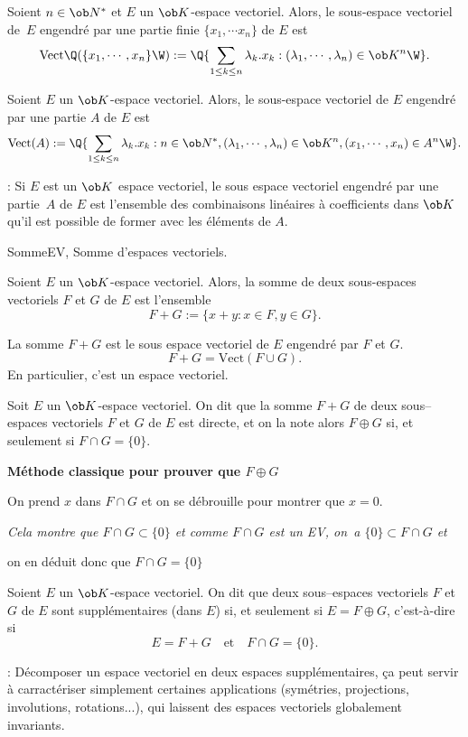 \Propriete []  Soient $n\in\ob N^*$ et $E$ un $\ob K$-espace vectoriel. Alors, le sous-espace vectoriel de~$E$ engendr\'e par une partie finie 
$\{x_1,\cdots x_n\}$ de $E$ est 
$$
{
\mbox{Vect}\Q(\{ x_1, \cdots, x_n\}\W):=\Q\{\sum_{1\le k\le n}\lambda_k.x_k:(\lambda_1,\cdots,\lambda_n)\in\ob K^n\W\}}.
$$

\Propriete []  Soient $E$ un $\ob K$-espace vectoriel. Alors, le sous-espace vectoriel de $E$ engendr\'e par une partie $A$ de $E$ est 
$$
\mbox{Vect}(A):=\Q\{\sum_{1\le k\le n}\lambda_k.x_k:n\in\ob N^*, (\lambda_1,\cdots,\lambda_n)\in\ob K^n, (x_1,\cdots, x_n)\in A^n\W\}.
$$

\Remarque : Si $E$ est un $\ob K$ espace vectoriel, le sous espace vectoriel engendr\'e par une partie~$A$ de $E$ est l'ensemble des combinaisons lin\'eaires \`a coefficients dans $\ob K$ qu'il est possible de former avec les \'el\'ements de $A$. 
\bigskip

\Subsection SommeEV, Somme d'espaces vectoriels. 
\bigskip

\noindent
Soient $E$ un $\ob K$-espace vectoriel. Alors, la somme de deux sous-espaces vectoriels $F$ et $G$ de $E$ est l'ensemble 
$$
F+G:=\{x+y:x\in F,y\in G\}. 
$$

\Propriete []  La somme $F+G$ est le sous espace vectoriel de $E$ engendr\'e par $F$ et $G$. 
$$
F+G=\mbox{Vect}(F\cup G).
$$
En particulier, c'est un espace vectoriel. 
\bigskip


Soit $E$ un $\ob K$-espace vectoriel. On dit que la somme $F+G$ de deux sous--espaces vectoriels $F$ et $G$ de $E$ est directe, 
et on la note alors $F\oplus G$ si, et seulement si $F\cap G=\{0\}.$
\bigskip

\centerline{\bf M\'ethode classique pour prouver que $F\oplus G$}
\medskip\noindent
On prend $x$ dans $F\cap G$ et on se d\'ebrouille pour montrer que $x=0$. 

\noindent
{\it Cela montre que $F\cap G\subset\{0\}$ et comme $F\cap G$ est un EV, on~a $\{0\}\subset F\cap G$ et 

on en d\'eduit donc que $F\cap G=\{0\}$}
\bigskip

Soient $E$ un $\ob K$-espace vectoriel. On dit que deux sous--espaces vectoriels $F$ et $G$ de $E$ 
sont suppl\'ementaires (dans $E$) si, et seulement si $E=F\oplus G$, c'est-\`a-dire si 
$$
E=F+G\quad\mbox{et}\quad F\cap G=\{0\}.
$$

\Remarque : D\'ecomposer un espace vectoriel en deux espaces suppl\'ementaires, \c ca peut servir \`a carract\'eriser simplement 
certaines applications (sym\'etries, projections, involutions, rotations...), qui laissent des espaces vectoriels globalement invariants.
\bigskip

